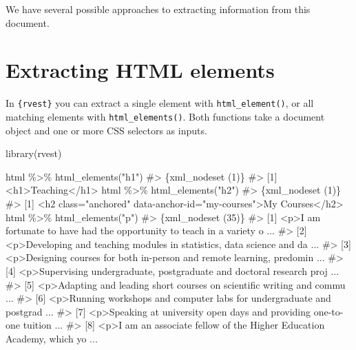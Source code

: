\documentclass[
  letterpaper,
  DIV=11,
  numbers=noendperiod]{scrreprt}
\newenvironment{Shaded}{\begin{snugshade}}{\end{snugshade}}
\newcommand{\CommentTok}[1]{\textcolor[rgb]{0.37,0.37,0.37}{#1}}
\newcommand{\FunctionTok}[1]{\textcolor[rgb]{0.28,0.35,0.67}{#1}}
\newcommand{\NormalTok}[1]{\textcolor[rgb]{0.00,0.23,0.31}{#1}}
\newcommand{\SpecialCharTok}[1]{\textcolor[rgb]{0.37,0.37,0.37}{#1}}
\newcommand{\StringTok}[1]{\textcolor[rgb]{0.13,0.47,0.30}{#1}}
\begin{document}
We have several possible approaches to extracting information from this
document.

\section{Extracting HTML elements}\label{extracting-html-elements}

In \texttt{\{rvest\}} you can extract a single element with
\texttt{html\_element()}, or all matching elements with
\texttt{html\_elements()}. Both functions take a document object and one
or more CSS selectors as inputs.

\begin{Shaded}
\begin{Highlighting}[]
\FunctionTok{library}\NormalTok{(rvest)}

\NormalTok{html }\SpecialCharTok{\%\textgreater{}\%} \FunctionTok{html\_elements}\NormalTok{(}\StringTok{"h1"}\NormalTok{)}
\CommentTok{\#\textgreater{} \{xml\_nodeset (1)\}}
\CommentTok{\#\textgreater{} [1] \textless{}h1\textgreater{}Teaching\textless{}/h1\textgreater{}}
\NormalTok{html }\SpecialCharTok{\%\textgreater{}\%} \FunctionTok{html\_elements}\NormalTok{(}\StringTok{"h2"}\NormalTok{)}
\CommentTok{\#\textgreater{} \{xml\_nodeset (1)\}}
\CommentTok{\#\textgreater{} [1] \textless{}h2 class="anchored" data{-}anchor{-}id="my{-}courses"\textgreater{}My Courses\textless{}/h2\textgreater{}}
\NormalTok{html }\SpecialCharTok{\%\textgreater{}\%} \FunctionTok{html\_elements}\NormalTok{(}\StringTok{"p"}\NormalTok{)}
\CommentTok{\#\textgreater{} \{xml\_nodeset (35)\}}
\CommentTok{\#\textgreater{}  [1] \textless{}p\textgreater{}I am fortunate to have had the opportunity to teach in a variety o ...}
\CommentTok{\#\textgreater{}  [2] \textless{}p\textgreater{}Developing and teaching modules in statistics, data science and da ...}
\CommentTok{\#\textgreater{}  [3] \textless{}p\textgreater{}Designing courses for both in{-}person and remote learning, predomin ...}
\CommentTok{\#\textgreater{}  [4] \textless{}p\textgreater{}Supervising undergraduate, postgraduate and doctoral research proj ...}
\CommentTok{\#\textgreater{}  [5] \textless{}p\textgreater{}Adapting and leading short courses on scientific writing and commu ...}
\CommentTok{\#\textgreater{}  [6] \textless{}p\textgreater{}Running workshops and computer labs for undergraduate and postgrad ...}
\CommentTok{\#\textgreater{}  [7] \textless{}p\textgreater{}Speaking at university open days and providing one{-}to{-}one tuition  ...}
\CommentTok{\#\textgreater{}  [8] \textless{}p\textgreater{}I am an associate fellow of the Higher Education Academy, which yo ...}

\end{Highlighting}
\end{Shaded}
\end{document}
